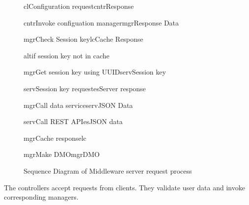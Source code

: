 \begin{figure}[h]
\begin{center}

	\resizebox{1.0\textwidth}{0.7\textwidth} {

	\begin{sequencediagram}

	\begin{call}{cl}{Configuration request}{cntr}{Response}

		\begin{call}{cntr}{Invoke configuation manager}{mgr}{Response Data}
			\begin{call}{mgr}{Check Session key}{lc}{Cache Response}\end{call}
			\begin{sdblock}{alt}{if session key not in cache}
				\begin{call}{mgr}{Get session key using UUID}{serv}{Session key}
					\begin{call}{serv}{Session key request}{es}{Server response}
					\end{call}
				\end{call}
			\end{sdblock}
			\begin{call}{mgr}{Call data service}{serv}{JSON Data}
				\begin{call}{serv}{Call REST API}{es}{JSON data}
				\end{call}
			\end{call}
			\begin{call}{mgr}{Cache response}{lc}{}
			\end{call}
			\begin{call}{mgr}{Make DMO}{mgr}{DMO}\end{call}
		\end{call}

	\end{call}

	\end{sequencediagram}
	}

\end{center}
\caption{Sequence Diagram of Middleware server request process}
\label{fig:ms_req}
\end{figure}

The controllers accept requests from clients. They validate user data and invoke corresponding managers.

